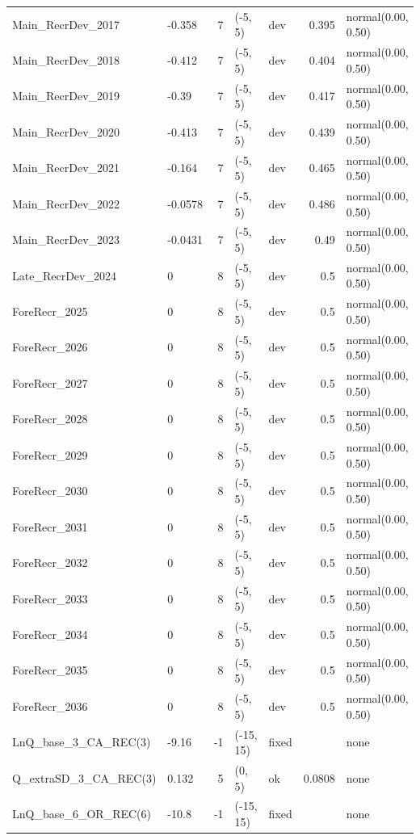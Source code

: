 \documentclass[
]{scrartcl}
\begin{document}
\begin{landscape}
\begin{longtable}{llrllrl}
Main\_RecrDev\_2017 & -0.358 & 7 & (-5, 5) & dev & 0.395 & normal(0.00, 0.50) \\ 
Main\_RecrDev\_2018 & -0.412 & 7 & (-5, 5) & dev & 0.404 & normal(0.00, 0.50) \\ 
Main\_RecrDev\_2019 & -0.39 & 7 & (-5, 5) & dev & 0.417 & normal(0.00, 0.50) \\ 
Main\_RecrDev\_2020 & -0.413 & 7 & (-5, 5) & dev & 0.439 & normal(0.00, 0.50) \\ 
Main\_RecrDev\_2021 & -0.164 & 7 & (-5, 5) & dev & 0.465 & normal(0.00, 0.50) \\ 
Main\_RecrDev\_2022 & -0.0578 & 7 & (-5, 5) & dev & 0.486 & normal(0.00, 0.50) \\ 
Main\_RecrDev\_2023 & -0.0431 & 7 & (-5, 5) & dev & 0.49 & normal(0.00, 0.50) \\ 
Late\_RecrDev\_2024 & 0 & 8 & (-5, 5) & dev & 0.5 & normal(0.00, 0.50) \\ 
ForeRecr\_2025 & 0 & 8 & (-5, 5) & dev & 0.5 & normal(0.00, 0.50) \\ 
ForeRecr\_2026 & 0 & 8 & (-5, 5) & dev & 0.5 & normal(0.00, 0.50) \\ 
ForeRecr\_2027 & 0 & 8 & (-5, 5) & dev & 0.5 & normal(0.00, 0.50) \\ 
ForeRecr\_2028 & 0 & 8 & (-5, 5) & dev & 0.5 & normal(0.00, 0.50) \\ 
ForeRecr\_2029 & 0 & 8 & (-5, 5) & dev & 0.5 & normal(0.00, 0.50) \\ 
ForeRecr\_2030 & 0 & 8 & (-5, 5) & dev & 0.5 & normal(0.00, 0.50) \\ 
ForeRecr\_2031 & 0 & 8 & (-5, 5) & dev & 0.5 & normal(0.00, 0.50) \\ 
ForeRecr\_2032 & 0 & 8 & (-5, 5) & dev & 0.5 & normal(0.00, 0.50) \\ 
ForeRecr\_2033 & 0 & 8 & (-5, 5) & dev & 0.5 & normal(0.00, 0.50) \\ 
ForeRecr\_2034 & 0 & 8 & (-5, 5) & dev & 0.5 & normal(0.00, 0.50) \\ 
ForeRecr\_2035 & 0 & 8 & (-5, 5) & dev & 0.5 & normal(0.00, 0.50) \\ 
ForeRecr\_2036 & 0 & 8 & (-5, 5) & dev & 0.5 & normal(0.00, 0.50) \\ 
LnQ\_base\_3\_CA\_REC(3) & -9.16 & -1 & (-15, 15) & fixed &  & none \\ 
Q\_extraSD\_3\_CA\_REC(3) & 0.132 & 5 & (0, 5) & ok & 0.0808 & none \\ 
LnQ\_base\_6\_OR\_REC(6) & -10.8 & -1 & (-15, 15) & fixed &  & none \\ 

\end{longtable}
\end{landscape}
\end{document}
